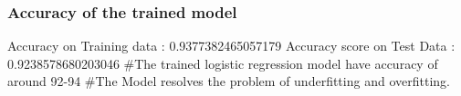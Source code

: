\documentclass[11pt]{article}
\begin{document}
    \hypertarget{accuracy-of-the-trained-model}{%
\subsubsection{Accuracy of the trained
model}\label{accuracy-of-the-trained-model}}
Accuracy on Training data :  0.9377382465057179
Accuracy score on Test Data :  0.9238578680203046
#The trained logistic regression model have accuracy of around 92-94%
#The Model resolves the problem of underfitting and overfitting.

    
    
    
    
\end{document}

